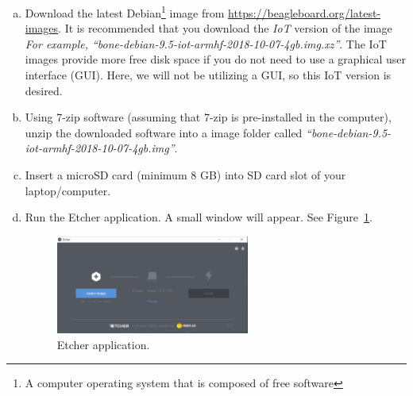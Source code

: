 \begin{enumerate}[a)]
  
\item Download the latest Debian\footnote{A computer operating system that is
    composed of free software} image from
  \url{https://beagleboard.org/latest-images}. It is recommended that you
  download the \emph{IoT} version of the image \emph{For example,
    ``bone-debian-9.5-iot-armhf-2018-10-07-4gb.img.xz''}.    The IoT images provide more free disk space if you do not need to use a graphical user interface (GUI). Here, we will not be utilizing a GUI, so this IoT version is desired. 
\item Using 7-zip software (assuming that 7-zip is pre-installed in the
  computer), unzip the downloaded software into a image folder called \emph{``bone-debian-9.5-iot-armhf-2018-10-07-4gb.img''}.

\item Insert a microSD card (minimum 8 GB) into SD card slot of your laptop/computer. 
\item Run the Etcher application. A small window will appear. See Figure~\ref{fig:Etcher}. %
%
\begin{figure}
    \centering
    \includegraphics[width= 0.6\textwidth]{figs/img/Lab0/Etcher.png}
    \caption{Etcher application.}
    \label{fig:Etcher}
\end{figure}
%


\end{enumerate}
